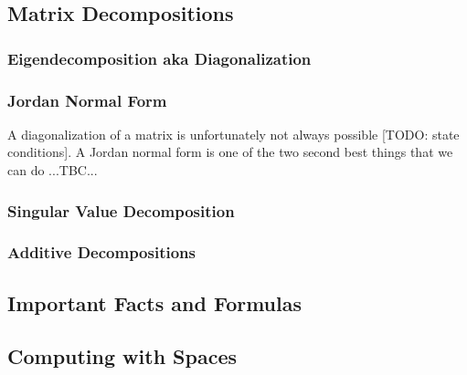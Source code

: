 \subsection{Matrix Decompositions}


\subsubsection{Eigendecomposition aka Diagonalization}



\subsubsection{Jordan Normal Form}
A diagonalization of a matrix is unfortunately not always possible [TODO: state conditions]. A Jordan normal form is one of the two second best things that we can do ...TBC...


\subsubsection{Singular Value Decomposition}



\subsubsection{Additive Decompositions}



\subsection{Important Facts and Formulas}

\subsection{Computing with Spaces}





